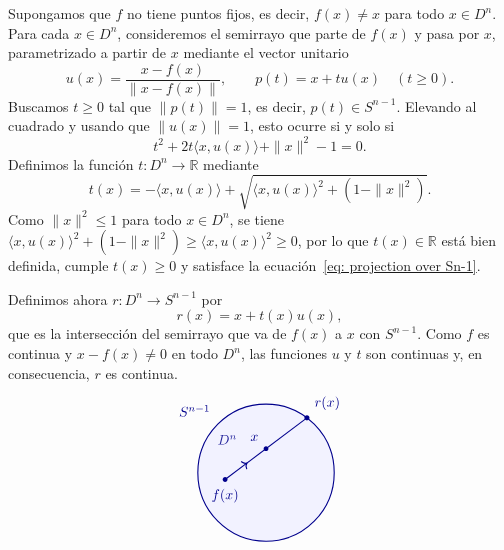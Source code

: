 \begin{dem}
Supongamos que $f$ no tiene puntos fijos, es decir, $f(x) \neq x$ para todo $x \in D^n$. Para cada $x \in D^n$, consideremos el semirrayo que parte de $f(x)$ y pasa por $x$, parametrizado a partir de $x$ mediante el vector unitario
\[
u(x) = \frac{x - f(x)}{\|x - f(x)\|}, \qquad p(t) = x + t u(x) \quad (t \geq 0).
\]
Buscamos $t \geq 0$ tal que $\|p(t)\| = 1$, es decir, $p(t) \in S^{n-1}$. Elevando al cuadrado y usando que $\|u(x)\| = 1$, esto ocurre si y solo si
\begin{equation}
\label{eq: projection over Sn-1}
t^2 + 2t\langle x, u(x) \rangle + \|x\|^2 - 1 = 0.
\end{equation}
Definimos la función $t \colon D^n \to \mathbb{R}$ mediante
\[
t(x) = -\langle x, u(x) \rangle + \sqrt{\langle x, u(x) \rangle^2 + (1 - \|x\|^2)}.
\]
Como $\|x\|^2 \leq 1$ para todo $x \in D^n$, se tiene $\langle x, u(x) \rangle^2 + (1 - \|x\|^2) \geq \langle x, u(x) \rangle^2 \geq 0$, por lo que $t(x) \in \mathbb{R}$ está bien definida, cumple $t(x) \geq 0$ y satisface la ecuación~\eqref{eq: projection over Sn-1}.

Definimos ahora $r \colon D^n \to S^{n-1}$ por
\[
r(x) = x + t(x) u(x),
\]
que es la intersección del semirrayo que va de $f(x)$ a $x$ con $S^{n-1}$. Como $f$ es continua y $x - f(x) \neq 0$ en todo $D^n$, las funciones $u$ y $t$ son continuas y, en consecuencia, $r$ es continua.
\[
\begin{tikzpicture}[baseline=(current bounding box.center), scale=1.15]
    \fill[blue!5] (0, 0) circle (1.5cm);
    \draw[thick, blue!55!black] (0, 0) circle (1.5cm);

    \node[blue!55!black!85] at (-0.85, 0.72) {$D^n$};
    \node[blue!55!black, above left=2pt] at (-1.06, 1.06) {$S^{n-1}$};

    \coordinate (F1) at (-0.90, -0.15);
    \coordinate (X1) at ( 0.00,  0.525);
    \coordinate (R1) at ( 0.90,  1.20);

    \draw[->, thick, blue!55!black] (F1) -- (-0.41, 0.2175);
    \draw[thick, blue!55!black] (-0.45, 0.1875) -- (R1);

    \fill[blue!55!black] (F1) circle (1.5pt) node[below=3pt] {$f(x)$};
    \fill[blue!55!black] (X1) circle (1.5pt) node[above left=2pt] {$x$};
    \fill[blue!55!black] (R1) circle (1.6pt) node[above right=2pt] {$r(x)$};

    \coordinate (F2) at (-0.15, -0.90);
    \coordinate (R2) at ( 1.20, -0.90);


\end{tikzpicture}\]
\end{dem}
